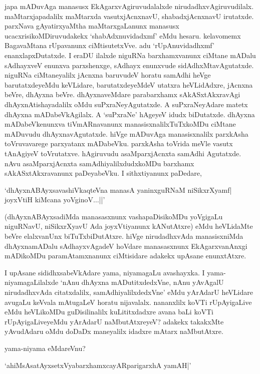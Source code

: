 japa mADuvAga manasusx EkAgarxvAgiruvudalalxde nirudadhxvAgiruvudilalx. maMtarxjapadalilx maMtarxda vasutxjAcnxnavU, shabadxjAcnxnavU irutatxde. parxNava gAyatirxyaMtha maMtarxgaLanunx manasusx ucacxrisikoMDiruvudakekx `shabAdxnuvidadxmf' eMdu hesaru. kelavomemx BagavaMtana rUpavanunx ciMtisutetxVve. adu `rUpAnuvidadhxmf' enanxlapxDutatxde. I eraDU ilalxde niguRNa barxhamxvanunx ciMtane mADalu sAdhayxveV enunxva parxshenxge, sAdhayx enunxvude sidAdhxMtavAgutatxde. niguRNa ciMtaneyalilx jAcnxna baruvudeV horatu samAdhi heVge barutatxdeyeMdu keVLidare, barutatxdeyeMdeV utatxra heVLidAdxre, jAcnxna beVre, dhAyxna beVre. dhAyxnaveMdare parabarxhamx sAkASxtAkxravAgi dhAyxnAtishayadalilx oMdu suPxraNeyAgutatxde. A suPxraNeyAdare matetx dhAyxna mADabeVkAgilalx. A `suPxraNe' hAgeyeV idudx biDutatxde. dhAyxna mADabeVkenunxva tiVmARnavanunx manasisxnalilxTuTxkoMDu ciMtane mADuvudu dhAyxnavAgutatxde. hiVge mADuvAga manasisxnalilx parxkAsha toVruvavarege parxyatanx mADabeVku. parxkAsha toVrida meVle vasutx tAnAgiyeV toVrutatxve. hAgiruvudu asaMparxjAcnxta samAdhi Agutatxde. nAvu asaMparxjAcnxta samAdhiyalilxdudxkoMDu barxhamx sAkASxtAkxravanunx paDeyabeVku. I sithxtiyanunx paDedare, 

\begin{shloka}
`dhAyxnABAyxsavashiVkaqteVna manasA yaninxguRNaM niSikxrXyamf|\\
joyxVtiH kiMcana yoVginoV$\ldots$||'
\end{shloka}

(dhAyxnABAyxsadiMda manasasxnunx vashapaDisikoMDu yoVgigaLu niguRNavU, niSikxrXyavU Ada joyxVtiyanunx kANutAtxre) eMdu heVLidaMte beVre elalxvanUnx biTuTxbiDutAtxre. hiVge nirudadhxvAda manasisxniMda dhAyxnamADalu sAdhayxvAgadeV hoVdare manasasxnunx EkAgarxvanAnxgi mADikoMDu paramAtamxnanunx ciMtisidare adakekx upAsane enunxtAtxre.

I upAsane sididhxsabeVkAdare yama, niyamagaLu avashayxka. I yama-niyamagaLilalxde `nAnu dhAyxna mADutitxdedxVne, nAnu yAvAgalU nirudadhxvAda citatxdalilx, samAdhiyalilxdedxVne' eMdu yArAdarU heVLidare avugaLu keVvala mAtugaLeV horatu nijavalalx. nananxlilx koVTi rUpAyigaLive eMdu heVLikoMDu guDisilinalilx kuLititxdadxre avana baLi koVTi rUpAyigaLiveyeMdu yArAdarU naMbutAtxreyeV? adakekx takakxMte yAvudAdaru oMdu doDaDx maneyalilx idadxre mAtarx naMbutAtxre.

yama-niyama eMdareVnu?

\begin{shloka}
`ahiMsAsatAyxsetxVyabarxhamxcayARparigarxhA yamAH|'
\end{shloka}

